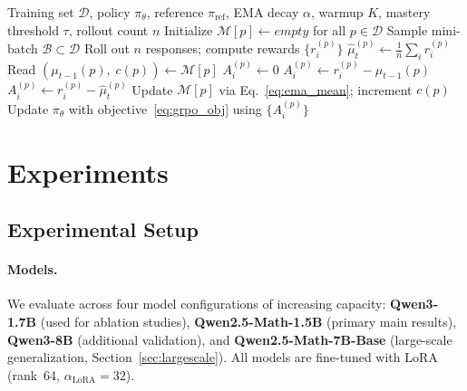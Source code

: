 \documentclass[11pt]{article}
\newcommand{\methodfull}{EMA-GRPO with Mastery Filter}
\theoremstyle{definition}
\begin{document}
\begin{algorithm}[t]
\caption{\methodfull}
\label{alg:ema_grpo}
\begin{algorithmic}[1]
\Require Training set $\mathcal{D}$, policy $\pi_\theta$, reference $\pi_{\mathrm{ref}}$,
         EMA decay $\alpha$, warmup $K$, mastery threshold $\tau$, rollout count $n$
\State Initialize $\mathcal{M}[p] \leftarrow \textit{empty}$ for all $p \in \mathcal{D}$
  \State Sample mini-batch $\mathcal{B} \subset \mathcal{D}$
    \State Roll out $n$ responses; compute rewards $\{r_i^{(p)}\}$
    \State $\hat{\mu}_t^{(p)} \leftarrow \frac{1}{n}\sum_i r_i^{(p)}$
    \State Read $(\mu_{t-1}(p),\; c(p)) \leftarrow \mathcal{M}[p]$
       \hfill{}
        \State $A_i^{(p)} \leftarrow 0$
       \hfill{}
        \State $A_i^{(p)} \leftarrow r_i^{(p)} - \mu_{t-1}(p)$
      \Else \hfill{}
        \State $A_i^{(p)} \leftarrow r_i^{(p)} - \hat{\mu}_t^{(p)}$
      \EndIf
    \EndFor
    \State Update $\mathcal{M}[p]$ via Eq.~\eqref{eq:ema_mean}; increment $c(p)$
  \EndFor
  \State Update $\pi_\theta$ with objective~\eqref{eq:grpo_obj} using $\{A_i^{(p)}\}$
\EndFor
\end{algorithmic}
\end{algorithm}

\section{Experiments}
\label{sec:experiments}

\subsection{Experimental Setup}
\label{sec:setup}

\paragraph{Models.}
We evaluate across four model configurations of increasing capacity:
\textbf{Qwen3-1.7B} (used for ablation studies),
\textbf{Qwen2.5-Math-1.5B} (primary main results),
\textbf{Qwen3-8B} (additional validation), and
\textbf{Qwen2.5-Math-7B-Base} (large-scale generalization, Section~\ref{sec:largescale}).
All models are fine-tuned with LoRA (rank~64, $\alpha_{\mathrm{LoRA}}=32$).
\end{document}
